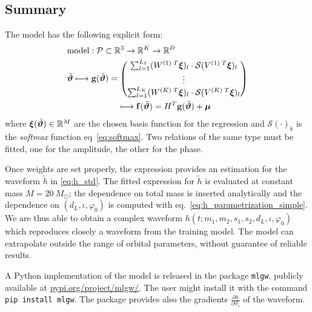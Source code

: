 \subsection{Summary}
The model has the following explicit form:
\begin{align}
	& \textrm{model}: \mathcal{P} \subset \mathbb{R}^3 \rightarrow \mathbb{R}^K \rightarrow \mathbb{R}^D \nonumber\\
	& {\tilde{\boldsymbol{\vartheta}}}
	\longmapsto  \mathbf{g}({\tilde{\boldsymbol{\vartheta}}} ) = 
		\begin{pmatrix}
		\sum_{l=1}^{L_1} (W^{(1)\;T} \boldsymbol{\xi})_l \cdot \mathcal{S}(V^{(1)\;T}\boldsymbol{\xi})_l \\
		\vdots \\
		\sum_{l=1}^{L_K}  (W^{(K)\;T} \boldsymbol{\xi})_l \cdot \mathcal{S}(V^{(K)\;T}\boldsymbol{\xi})_l
		\end{pmatrix}
	\nonumber \\	
	& \qquad \qquad \qquad \longmapsto \mathbf{f}({\tilde{\boldsymbol{\vartheta}}} ) = H^T \mathbf{g}({\tilde{\boldsymbol{\vartheta}}} ) + \boldsymbol{\mu} \label{eq:model}
\end{align}
where ${\boldsymbol{\xi}}({\tilde{\boldsymbol{\vartheta}}}) \in \mathbb{R}^M $ are the chosen basis function for the regression and $\mathcal{S}(\cdot)_k$ is the \textit{softmax} function eq~\eqref{eq:softmax}.
Two relations of the same type must be fitted, one for the amplitude, the other for the phase.
\par
Once weights are set properly, the expression provides an estimation for the waveform $\tilde{h}$ in \eqref{eq:h_std}.
The fitted expression for  $\tilde{h}$ is evaluated at constant mass $M = \SI{20}{M_\odot}$; the dependence on total mass is inserted analytically and the dependence on $(d_L, \iota, \varphi_0)$ is computed with eq.~\eqref{eq:h_parametrization_simple}.
We are thus able to obtain a complex waveform $h(t;m_1,m_2, s_1, s_2, d_L, \iota, \varphi_0)$ which reproduces closely a waveform from the training model.
The model can extrapolate outside the range of orbital parameters, without guarantee of reliable results.
\par
A Python implementation of the model is released in the package \texttt{mlgw}, publicly available at \href{https://pypi.org/project/mlgw/}{pypi.org/project/mlgw/}. The user might install it with the command \texttt{pip install mlgw}. The package provides also the gradients $\frac{\partial h}{\partial \vartheta_i}$ of the waveform.

